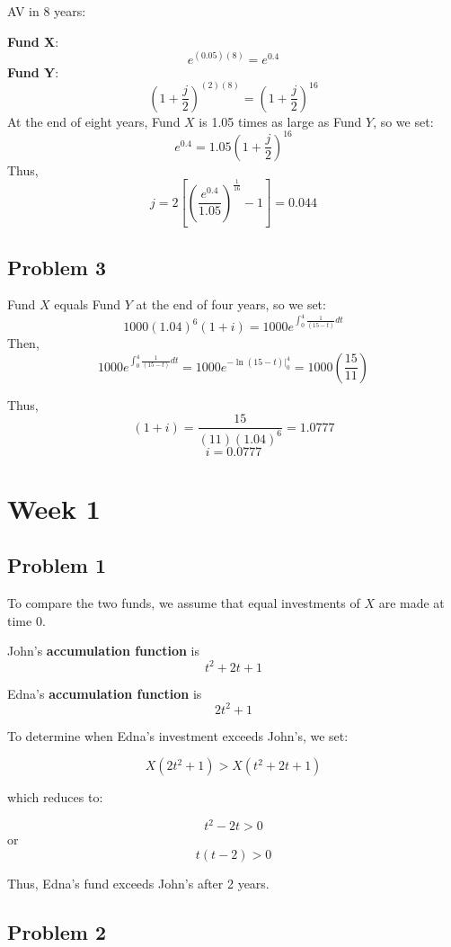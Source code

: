 \documentclass[
]{book}
\begin{document}
AV in 8 years:

\textbf{Fund X}:\[e^{(0.05)(8)}=e^{0.4}\]
\textbf{Fund Y}:\[\left(1+\frac{j}{2}\right)^{(2)(8)}=\left(1+\frac{j}{2}\right)^{16}\]
At the end of eight years, Fund \(X\) is 1.05 times as large as Fund \(Y\), so we set:
\[e^{0.4}=1.05\left(1+\frac{j}{2}\right)^{16}\]
Thus,
\[j=2\left[\left(\frac{e^{0.4}}{1.05}\right)^{\frac{1}{16}}-1\right]=0.044\]

\hypertarget{problem-3}{%
\subsection*{Problem 3}\label{problem-3}}

Fund \(X\) equals Fund \(Y\) at the end of four years, so we set:
\[1000(1.04)^{6}(1+i)=1000e^{\int_{0}^{4} \frac{1}{(15-t)} dt}\]
Then,
\[1000e^{\int_{0}^{4} \frac{1}{(15-t)} dt}=1000e^{-\ln(15-t)|_{0}^{4}}=1000\left(\frac{15}{11}\right)\]

Thus,
\[(1+i)=\frac{15}{(11)(1.04)^6}=1.0777\]
\[i=0.0777\]

\hypertarget{week-1}{%
\section*{Week 1}\label{week-1}}

\hypertarget{problem-1-1}{%
\subsection*{Problem 1}\label{problem-1-1}}

To compare the two funds, we assume that equal investments of \(X\) are made at time 0.

John's \textbf{accumulation function} is \[t^2+2t+1\]

Edna's \textbf{accumulation function} is \[2t^{2}+1\]

To determine when Edna's investment exceeds John's, we set:

\[ X(2t^{2}+1)>X(t^{2}+2t+1)\]

which reduces to:

\[t^{2}-2t>0\] or \[t(t-2)>0\]

Thus, Edna's fund exceeds John's after 2 years.

\hypertarget{problem-2-1}{%
\subsection*{Problem 2}\label{problem-2-1}}
\end{document}
